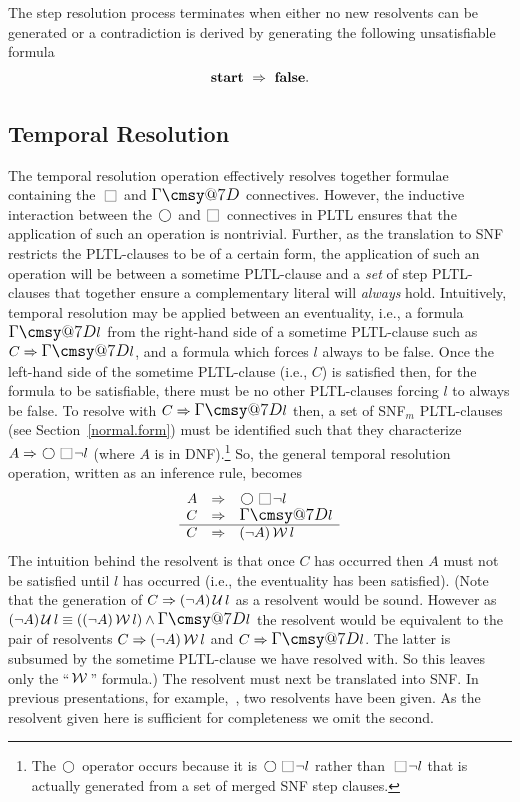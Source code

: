 \documentclass[nohyperref]{acmtrans2f}
\makeatletter
\def\sometime{\mathord{\hbox{\large$\mathchar"0\cmsy@7D$}}}
\newcommand{\always}{\raisebox{-.2ex}{
                           \mbox{\unitlength=0.9ex
                           \begin{picture}(2,2)
                           \linethickness{0.06ex}
                           \put(0,0){\line(1,0){2}}
                           \put(0,2){\line(1,0){2}}
                           \put(0,0){\line(0,1){2}}
                           \put(2,0){\line(0,1){2}}
                           \end{picture}}}
                          \,}
\newcommand{\next}{\!\raisebox{-.2ex}{ %
                        \mbox{\unitlength=0.9ex
                        \begin{picture}(2,2)
                        \linethickness{0.06ex}
                        \put(1,1){\circle{2}} %
                        \end{picture}}}       %
                        \,}
\def\until{\hbox{$\,\cal U \,$}}
\def\unless{\hbox{$\,\cal W \,$}}
\let\imp=\Rightarrow
\def\ltrue{\hbox{\rm\bf true}}
\def\lfalse{\hbox{\rm\bf false}}
\def\lstart{\hbox{\rm\bf start}}
\makeatother
\begin{document}
The step resolution process terminates when either no new resolvents
can be generated or a contradiction is derived by generating %
the following unsatisfiable formula
$$
\lstart\ \Rightarrow\ \lfalse. %
$$

\subsection{Temporal Resolution}
\label{tresrule:old}
%
The temporal resolution operation effectively resolves together
formulae containing the $\always$ and $\sometime$
connectives. However, the inductive interaction between the $\next$
and $\!\always$ connectives in PLTL ensures that the application of
such an operation is nontrivial. Further, as the translation to SNF
restricts the PLTL-clauses to be of a certain form, the application of such
an operation will be between a sometime PLTL-clause and a {\em set\/} of step
PLTL-clauses that together ensure a complementary literal will {\em always}
hold.  Intuitively, temporal resolution may be applied between an
eventuality, i.e., a formula $\sometime l$ from the right-hand side of
a sometime PLTL-clause such as $C \Rightarrow \sometime l$, and a formula
which forces $l$ always to be false. Once the left-hand side of the
sometime PLTL-clause (i.e., $C$) is satisfied then, for the formula to be
satisfiable, there must be no other
PLTL-clauses forcing $l$ to always be false. To resolve with $C \Rightarrow
\sometime l$ then, a set of SNF$_m$ PLTL-clauses (see Section~\ref{normal.form})
must be identified such that they characterize $A \imp \next \always
\neg l$ (where $A$ is in DNF).\footnote{The $\next$ operator occurs because
it is $\next \always \neg l$ rather than $\always \neg l$ that is actually
generated from a set of merged SNF step 
clauses.}
So, the general temporal resolution
operation, written as an inference rule, becomes
%
%
$$
\begin{array}{rcl}
A  & \Rightarrow & \next \always \neg l \\
C  & \Rightarrow & \sometime l \\ \hline
C   & \Rightarrow & (\neg A) \unless l
\end{array}
$$
%
The intuition behind the resolvent is that once $C$ has occurred then
$A$ must not be satisfied until $l$ has occurred (i.e., the
eventuality has been satisfied). 
(Note that the generation of $C \imp (\neg A) \until l$ as a
resolvent would be sound. However as $(\neg A) \until l \equiv ((\neg
A) \unless l) \land \sometime l$ the resolvent would be equivalent to the
pair of resolvents $C \imp (\neg A) \unless l$ and  $C \imp \sometime l$.
The latter is subsumed by the sometime PLTL-clause we have resolved with.
So this leaves only the ``$\unless$'' formula.) The resolvent must next be
translated into SNF. 
In previous presentations, for example,~, two
resolvents have been given. As the resolvent given here is sufficient
for completeness we omit the second.
\end{document}
